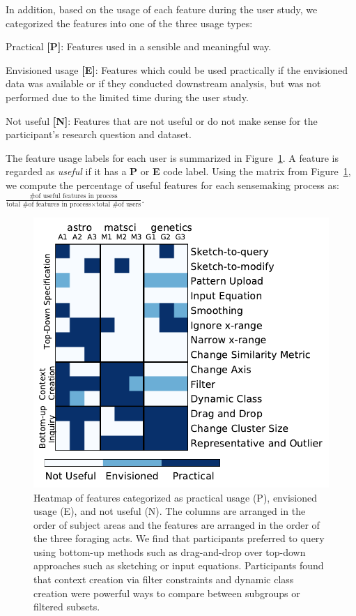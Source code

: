 \npar In addition, based on the usage of each feature during the user study, we categorized the features into one of the three usage types:
\begin{denselist}
    \item Practical \textbf{[P]}: Features used in a sensible and meaningful way.
    \item Envisioned usage \textbf{[E]}: Features which could be used practically if the envisioned data was available or if they conducted downstream analysis, but was not performed due to the limited time during the user study.
    \item Not useful \textbf{[N]}: Features that are not useful or do not make sense for the participant's research question and dataset.
\end{denselist}
The feature usage labels for each user is summarized in Figure~\ref{feature_heatmap}. A feature is regarded as \emph{useful} if it has a \textbf{P} or \textbf{E} code label. Using the matrix from Figure~\ref{feature_heatmap}, we compute the percentage of useful features for each sensemaking process as: $\frac{\textrm{\# of useful features in process}}{\textrm{total \# of features in process} \times \textrm{total \# of users}}$.
\begin{figure}[h!]
    \centering
    \includegraphics[width=0.75\columnwidth]{figures/PENcoding.pdf}
    \vspace{-6pt}\caption{Heatmap of features categorized as practical usage (P), envisioned usage (E), and not useful (N). The columns are arranged in the order of subject areas and the features are arranged in the order of the three foraging acts. We find that participants preferred to query using bottom-up methods such as drag-and-drop over top-down approaches such as sketching or input equations. Participants found that context creation via filter constraints and dynamic class creation were powerful ways to compare between subgroups or filtered subsets.}
    \label{feature_heatmap}
    \vspace{-5pt}
\end{figure}
